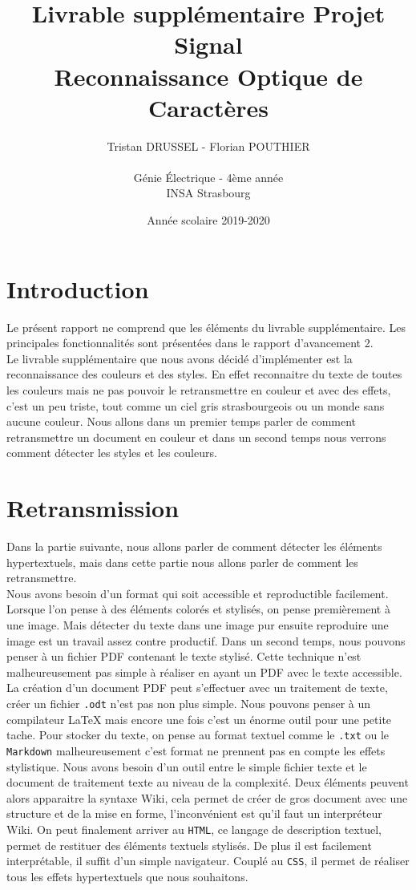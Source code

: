 \documentclass[a4paper,12pt,titlepage]{report}
\title{Livrable supplémentaire Projet Signal\\Reconnaissance Optique de Caractères}
\author{Tristan DRUSSEL - Florian POUTHIER \\ \\ Génie Électrique - 4ème année\\ INSA Strasbourg}
\date{Année scolaire 2019-2020}
\begin{document}
	\begin{titlepage}
		\maketitle
	\end{titlepage}
	\tableofcontents
	\newpage
	\section{Introduction}
	Le présent rapport ne comprend que les éléments du livrable supplémentaire. Les principales fonctionnalités sont présentées dans le rapport d'avancement 2. \\
	Le livrable supplémentaire que nous avons décidé d'implémenter est la reconnaissance des couleurs et des styles. En effet reconnaitre du texte de toutes les couleurs mais ne pas pouvoir le retransmettre en couleur et avec des effets, c'est un peu triste, tout comme un ciel gris strasbourgeois ou un monde sans aucune couleur.
	Nous allons dans un premier temps parler de comment retransmettre un document en couleur et dans un second temps nous verrons comment détecter les styles et les couleurs.
	\section{Retransmission}
	Dans la partie suivante, nous allons parler de comment détecter les éléments hypertextuels, mais dans cette partie nous allons parler de comment les retransmettre.\\
	Nous avons besoin d'un format qui soit accessible et reproductible facilement. Lorsque l'on pense à des éléments colorés et stylisés, on pense premièrement à une image. Mais détecter du texte dans une image pur ensuite reproduire une image est un travail assez contre productif. Dans un second temps, nous pouvons penser à un fichier PDF contenant le texte stylisé. Cette technique n'est malheureusement pas simple à réaliser en ayant un PDF avec le texte accessible. La création d'un document PDF peut s'effectuer avec un traitement de texte, créer un fichier \texttt{.odt} n'est pas non plus simple. Nous pouvons penser à un compilateur \LaTeX{} mais encore une fois c'est un énorme outil pour une petite tache. Pour stocker du texte, on pense au format textuel comme le \texttt{.txt} ou le \texttt{Markdown} malheureusement c'est format ne prennent pas en compte les effets stylistique. Nous avons besoin d'un outil entre le simple fichier texte et le document de traitement texte au niveau de la complexité. Deux éléments peuvent alors apparaitre la syntaxe Wiki, cela permet de créer de gros document avec une structure et de la mise en forme, l'inconvénient est qu'il faut un interpréteur Wiki. On peut finalement arriver au \texttt{HTML}, ce langage de description textuel, permet de restituer des éléments textuels stylisés. De plus il est facilement interprétable, il suffit d'un simple navigateur. Couplé au \texttt{CSS}, il permet de réaliser tous les effets hypertextuels que nous souhaitons.
\end{document}
